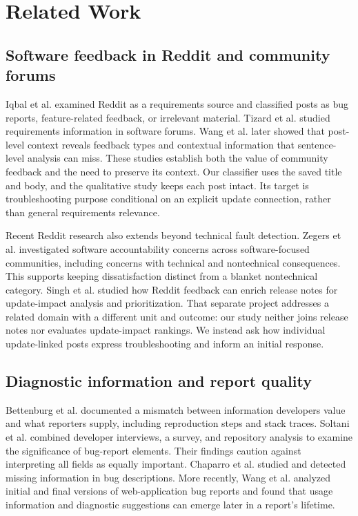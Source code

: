 \documentclass[conference,letterpaper]{IEEEtran}
\begin{document}
\section{Related Work}
\subsection{Software feedback in Reddit and community forums}

Iqbal et al. \cite{Iqbal2021Reddit} examined Reddit as a requirements source and classified posts as bug reports, feature-related feedback, or irrelevant material. Tizard et al. \cite{Tizard2019Forums} studied requirements information in software forums. Wang et al. \cite{Wang2024Forums} later showed that post-level context reveals feedback types and contextual information that sentence-level analysis can miss. These studies establish both the value of community feedback and the need to preserve its context. Our classifier uses the saved title and body, and the qualitative study keeps each post intact. Its target is troubleshooting purpose conditional on an explicit update connection, rather than general requirements relevance.

Recent Reddit research also extends beyond technical fault detection. Zegers et al. \cite{Zegers2025Accountability} investigated software accountability concerns across software-focused communities, including concerns with technical and nontechnical consequences. This supports keeping dissatisfaction distinct from a blanket nontechnical category. Singh et al. \cite{Singh2024ReleaseNotes} studied how Reddit feedback can enrich release notes for update-impact analysis and prioritization. That separate project addresses a related domain with a different unit and outcome: our study neither joins release notes nor evaluates update-impact rankings. We instead ask how individual update-linked posts express troubleshooting and inform an initial response.

\subsection{Diagnostic information and report quality}

Bettenburg et al. \cite{Bettenburg2008GoodReport} documented a mismatch between information developers value and what reporters supply, including reproduction steps and stack traces. Soltani et al. \cite{Soltani2020Elements} combined developer interviews, a survey, and repository analysis to examine the significance of bug-report elements. Their findings caution against interpreting all fields as equally important. Chaparro et al. \cite{Chaparro2017Missing} studied and detected missing information in bug descriptions. More recently, Wang et al. \cite{Wang2025InformationNeeds} analyzed initial and final versions of web-application bug reports and found that usage information and diagnostic suggestions can emerge later in a report's lifetime.
\end{document}
